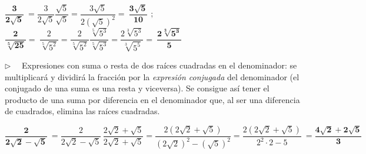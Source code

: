 \begin{miejemplo}

\begin{small}
$\boldsymbol{ \dfrac{3}{2\sqrt{5}} }	\ = \dfrac{3}{2\sqrt{5}}\dfrac{\sqrt{5}}{\sqrt{5}}=\dfrac{3\sqrt{5}}{2(\sqrt{5})^2}=\ \boldsymbol{\dfrac{3\sqrt{5}}{10}}$
$;\qquad \ \ $
$\boldsymbol{ \dfrac{2}{ \sqrt[5]{25} } } = \  \dfrac{2}{ \sqrt[5]{5^2} } = \dfrac{2}{ \sqrt[5]{5^2} } \dfrac{\sqrt[5]{5^3}}{\sqrt[5]{5^3}}=\dfrac{2\sqrt[3]{5^3}}{\sqrt[3]{5^5}} =\ \boldsymbol{ \dfrac{2\sqrt[3]{5^3}}{5} }$\end{small}
\end{miejemplo}

\vspace{5mm}
$\triangleright\quad$ \normalsize{Expresiones} con suma o resta de dos raíces cuadradas en el denominador: se multiplicará y dividirá la fracción por la \emph{expresión conjugada} del denominador (el conjugado de una suma es una resta y viceversa). Se consigue así tener el producto de una suma por diferencia en el denominador que, al ser una diferencia de cuadrados, elimina las raíces cuadradas.

\begin{miejemplo}

\begin{small}$\boldsymbol{\dfrac{2}{2\sqrt{2}-\sqrt{5}}}\ = \dfrac{2}{2\sqrt{2}-\sqrt{5}}\,  \dfrac{2\sqrt{2}+\sqrt{5}}{2\sqrt{2}+\sqrt{5}} = \dfrac{2(2\sqrt{2}+\sqrt{5})}{(2\sqrt{2})^2-(\sqrt{5})^2}=\dfrac{2(2\sqrt{2}+\sqrt{5})}{2^2\cdot 2-5} \ = \boldsymbol{\dfrac{4\sqrt{2}+2\sqrt{5}}{3}}$	\end{small}
\end{miejemplo}
\vspace{5mm}

